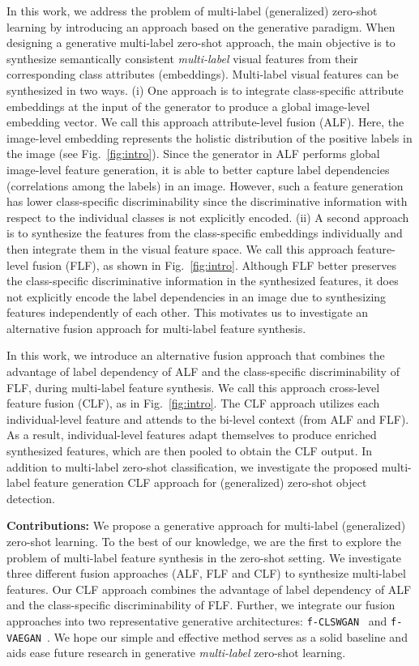 \documentclass[10pt,journal,compsoc]{IEEEtran}
\newcommand{\clswgan}{\texttt{f-CLSWGAN}}
\newcommand{\vaegan}{\texttt{f-VAEGAN}}
\begin{document}
In this work, we address the problem of multi-label (generalized) zero-shot learning by introducing an approach based on the generative paradigm. 
When designing a generative multi-label zero-shot approach, the main objective is to synthesize semantically consistent \textit{multi-label} visual features from their corresponding class attributes (embeddings). 
Multi-label visual features can be synthesized in two ways. (i) One approach is to integrate class-specific attribute embeddings at the input of the generator to produce a global image-level embedding vector. We call this approach attribute-level fusion (ALF). Here, the image-level embedding represents the holistic distribution of the positive labels in the image (see Fig.~\ref{fig:intro}). Since the generator in ALF performs global image-level feature generation, it is able to better capture label dependencies (correlations among the labels) in an image. However, such a feature generation has lower class-specific discriminability since the discriminative information with respect to the individual classes is not explicitly encoded.  (ii) A second approach is to synthesize the features from the class-specific embeddings individually and then integrate them in the visual feature space. We call this approach feature-level fusion (FLF), as shown in Fig.~\ref{fig:intro}. Although FLF better preserves the class-specific discriminative information in the synthesized features, it does not explicitly encode the label dependencies in an image due to synthesizing features independently of each other. This motivates us to investigate an alternative fusion approach for
multi-label feature synthesis.

In this work, we introduce an alternative fusion approach that combines the advantage of label dependency of ALF and the class-specific discriminability of FLF, during multi-label feature synthesis. We call this approach cross-level feature fusion (CLF), as in Fig.~\ref{fig:intro}. The CLF approach utilizes each individual-level feature and attends to the bi-level context (from ALF and FLF). As a result, individual-level features adapt themselves to produce enriched synthesized features, which are then pooled to obtain the CLF output. In  addition  to  multi-label  zero-shot  classification,  we investigate the proposed multi-label feature generation CLF approach for (generalized) zero-shot object detection.


\noindent \textbf{Contributions:} 
We propose a generative approach for multi-label (generalized) zero-shot learning. To the best of our knowledge, we are the first to explore the problem of multi-label feature synthesis in the zero-shot setting. 
We investigate three different fusion approaches (ALF, FLF and CLF) to synthesize multi-label features. Our CLF approach combines the  advantage  of  label  dependency of  ALF  and  the  class-specific discriminability of FLF. Further, we integrate our fusion approaches into two representative generative architectures: \clswgan{}~\cite{xian2018feature} and \vaegan{}~\cite{xian2019f}. We hope our simple and effective method serves as a solid baseline and aids ease future research in generative \textit{multi-label} zero-shot learning.
\end{document}
